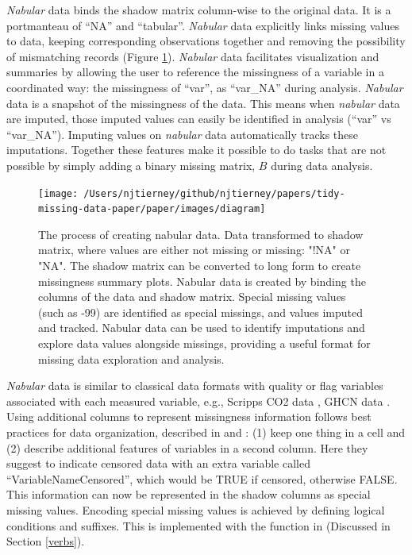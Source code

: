 \documentclass[
]{jss}
\begin{document}
\emph{Nabular} data binds the shadow matrix column-wise to the original data. It is a portmanteau of ``NA'' and ``tabular''. \emph{Nabular} data explicitly links missing values to data, keeping corresponding observations together and removing the possibility of mismatching records (Figure \ref{fig:nabularfig}). \emph{Nabular} data facilitates visualization and summaries by allowing the user to reference the missingness of a variable in a coordinated way: the missingness of ``var'', as ``var\_NA'' during analysis. \emph{Nabular} data is a snapshot of the missingness of the data. This means when \emph{nabular} data are imputed, those imputed values can easily be identified in analysis (``var'' vs ``var\_NA''). Imputing values on \emph{nabular} data automatically tracks these imputations. Together these features make it possible to do tasks that are not possible by simply adding a binary missing matrix, \(B\) during data analysis.

\begin{CodeChunk}
\begin{figure}

{\centering \texttt{[image: /Users/njtierney/github/njtierney/papers/tidy-missing-data-paper/paper/images/diagram]} 

}

\caption[The process of creating nabular data]{The process of creating nabular data. Data transformed to shadow matrix, where values are either not missing or missing: "!NA" or "NA". The shadow matrix can be converted to long form to create missingness summary plots. Nabular data is created by binding the columns of the data and shadow matrix. Special missing values (such as -99) are identified as special missings, and values imputed and tracked. Nabular data can be used to identify imputations and explore data values alongside missings, providing a useful format for missing data exploration and analysis.}\label{fig:nabularfig}
\end{figure}
\end{CodeChunk}

\emph{Nabular} data is similar to classical data formats with quality or flag variables associated with each measured variable, e.g., Scripps CO2 data \citep{Keeling2005-scripps}, GHCN data \citep{Durre2008-ghcn}. Using additional columns to represent missingness information follows best practices for data organization, described in \citep{Ellis2018} and \citep{Broman2018}: (1) keep one thing in a cell and (2) describe additional features of variables in a second column. Here they suggest to indicate censored data with an extra variable called ``VariableNameCensored'', which would be TRUE if censored, otherwise FALSE. This information can now be represented in the shadow columns as special missing values. Encoding special missing values is achieved by defining logical conditions and suffixes. This is implemented with the  function in  (Discussed in Section \ref{verbs}).
\end{document}
